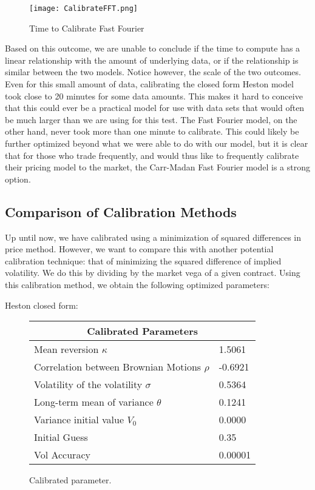 \documentclass[fontsize=12pt]{article}
\numberwithin{equation}{section} %
\numberwithin{figure}{section} %
\numberwithin{table}{section} %
\begin{document}
\begin{figure}[H]
  \centering
   \texttt{[image: CalibrateFFT.png]}
  \caption{Time to Calibrate Fast Fourier}
  \label{fig:FFT Time}
\end{figure}

Based on this outcome, we are unable to conclude if the time to compute has a linear relationship with the amount of underlying data, or if the relationship is similar between the two models. Notice however, the scale of the two outcomes. Even for this small amount of data, calibrating the closed form Heston model took close to 20 minutes for some data amounts. This makes it hard to conceive that this could ever be a practical model for use with data sets that would often be much larger than we are using for this test. The Fast Fourier model, on the other hand, never took more than one minute to calibrate. This could likely be further optimized beyond what we were able to do with our model, but it is clear that for those who trade frequently, and would thus like to frequently calibrate their pricing model to the market, the Carr-Madan Fast Fourier model is a strong option.


\subsection{Comparison of Calibration Methods} \label{Comparison of Calibration Methods}

Up until now, we have calibrated using a minimization of squared differences in price method. However, we want to compare this with another potential calibration technique: that of minimizing the squared difference of implied volatility. We do this by dividing by the market vega of a given contract. Using this calibration method, we obtain the following optimized parameters:

Heston closed form:

\begin{figure}[H]
\centering
\begin{tabular}{| p{6.5cm}| p{2.0cm} |}
\hline
\multicolumn{2}{|c|}{Calibrated Parameters} \\
\hline
Mean reversion $\kappa$ & 1.5061 \\ \hline
Correlation between Brownian Motions $\rho$ & -0.6921 \\ \hline
Volatility of the volatility $\sigma$ & 0.5364 \\ \hline
Long-term mean of variance $\theta$ & 0.1241 \\ \hline
Variance initial value $V_0$ & 0.0000 \\ \hline
Initial Guess & 0.35 \\ \hline
Vol Accuracy & 0.00001 \\ \hline
\end{tabular}
\caption{Calibrated parameter.}
\label{tabla:Calibrated Parameters Closed Form}
\end{figure}
\end{document}
